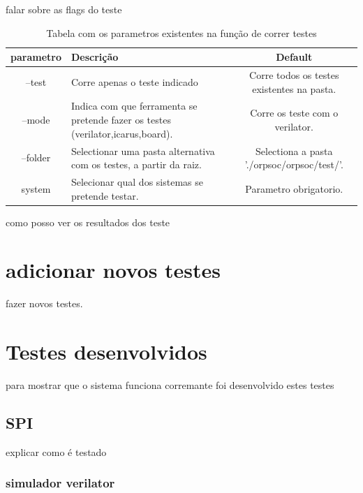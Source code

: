 falar sobre as flags do teste
\begin{table}[h!]
  \begin{center}
    \begin{tabular}{|c|C{8cm}|c|}
      \hline
      parametro & Descrição & Default \\
      \hline \hline
      --test & Corre apenas o teste indicado & Corre todos os testes existentes na pasta. \\
      \hline
      --mode & Indica com que ferramenta se pretende fazer os testes  (verilator,icarus,board). & Corre os teste com o verilator. \\ 
      \hline
      --folder & Selectionar uma pasta alternativa com os testes, a partir da raiz. & Selectiona a pasta './orpsoc/orpsoc/test/'.\\
      \hline
      system & Selecionar qual dos sistemas se pretende testar. & Parametro obrigatorio.\\
      \hline
    \end{tabular}
  \end{center}
  \caption[Tabela com os parametros existentes na função de correr testes]{Tabela com os parametros existentes na função de correr testes}
  \label{table:Flags}
\end{table}

como posso ver os resultados dos teste

\section{adicionar novos testes}

fazer novos testes.

\section{Testes desenvolvidos}

para mostrar que o sistema funciona corremante foi desenvolvido estes testes 

\subsection{SPI}

explicar como é testado

\subsubsection{simulador verilator}

